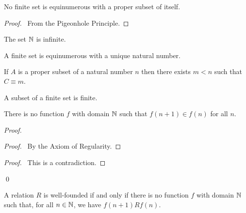 \begin{theorem}
    No finite set is equinumerous with a proper subset of itself.
\end{theorem}

\begin{proof}
    \pf\ From the Pigeonhole Principle.
\end{proof}

\begin{corollary}
    The set $\mathbb{N}$ is infinite.
\end{corollary}

\begin{corollary}
    A finite set is equinumerous with a unique natural number.
\end{corollary}

\begin{lemma}
    If $A$ is a proper subset of a natural number $n$ then there exists
    $m < n$ such that $C \equiv m$.
\end{lemma}

\begin{corollary}
    A subset of a finite set is finite.
\end{corollary}

\begin{theorem}[Regularity]
    There is no function $f$ with domain $\mathbb{N}$ such that $f(n+1) \in f(n)$ for all $n$.
\end{theorem}

\begin{proof}
    \pf
    \begin{proof}
        \pf\ By the Axiom of Regularity.
    \end{proof}
    \qedstep
    \begin{proof}
        \pf\ This is a contradiction.
    \end{proof}
    \qed
\end{proof}

\begin{theorem}
    A relation $R$ is well-founded if and only if there is no function $f$ with domain $\mathbb{N}$
    such that, for all $n \in \mathbb{N}$, we have $f(n+1) R f(n)$.
\end{theorem}